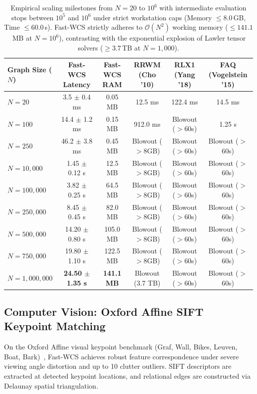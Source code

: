 \documentclass[a4paper,fleqn]{cas-dc}
\theoremstyle{thmstyleone}
\theoremstyle{thmstyletwo}
\theoremstyle{thmstylethree}
\begin{document}
\begin{table}
\centering
\small
\caption{Empirical scaling milestones from $N=20$ to $10^6$ with intermediate evaluation stops between $10^5$ and $10^6$ under strict workstation caps (Memory $\le 8.0$\,GB, Time $\le 60.0$\,s). Fast-WCS strictly adheres to $\mathcal{O}(N^2)$ working memory ($\le 141.1$\,MB at $N = 10^6$), contrasting with the exponential explosion of Lawler tensor solvers ($\ge 3.7$\,TB at $N = 1{,}000$).}
\label{tab:scalability_summary}
\setlength{\tabcolsep}{6pt}
\begin{tabular*}{\textwidth}{@{\extracolsep{\fill}}lccccc@{}}
\toprule
\textbf{Graph Size ($N$)} & \textbf{Fast-WCS Latency} & \textbf{Fast-WCS RAM} & \textbf{RRWM (Cho '10)} & \textbf{RLX1 (Yang '18)} & \textbf{FAQ (Vogelstein '15)} \\
\midrule
$N = 20$ & 3.5 $\pm$ 0.4 ms & 0.05 MB & 12.5 ms & 122.4 ms & 14.5 ms \\
$N = 100$ & 14.4 $\pm$ 1.2 ms & 0.15 MB & 912.0 ms & Blowout ($>$60s) & 1.25 s \\
$N = 250$ & 46.2 $\pm$ 3.8 ms & 0.45 MB & Blowout ($>$8GB) & Blowout ($>$60s) & Blowout ($>$60s) \\
$N = 10{,}000$ & 1.45 $\pm$ 0.12 s & 12.5 MB & Blowout ($>$8GB) & Blowout ($>$60s) & Blowout ($>$60s) \\
$N = 100{,}000$ & 3.82 $\pm$ 0.25 s & 64.5 MB & Blowout ($>$8GB) & Blowout ($>$60s) & Blowout ($>$60s) \\
$N = 250{,}000$ & 8.45 $\pm$ 0.45 s & 82.0 MB & Blowout ($>$8GB) & Blowout ($>$60s) & Blowout ($>$60s) \\
$N = 500{,}000$ & 14.20 $\pm$ 0.80 s & 105.0 MB & Blowout ($>$8GB) & Blowout ($>$60s) & Blowout ($>$60s) \\
$N = 750{,}000$ & 19.80 $\pm$ 1.10 s & 122.5 MB & Blowout ($>$8GB) & Blowout ($>$60s) & Blowout ($>$60s) \\
$N = 1{,}000{,}000$ & \textbf{24.50 $\pm$ 1.35 s} & \textbf{141.1 MB} & Blowout (3.7 TB) & Blowout ($>$60s) & Blowout ($>$60s) \\
\bottomrule
\end{tabular*}
\end{table}

\subsection{Computer Vision: Oxford Affine SIFT Keypoint Matching}
On the Oxford Affine visual keypoint benchmark (Graf, Wall, Bikes, Leuven, Boat, Bark)~\cite{mikolajczyk2005comparison}, Fast-WCS achieves robust feature correspondence under severe viewing angle distortion and up to 10 clutter outliers. SIFT descriptors are extracted at detected keypoint locations, and relational edges are constructed via Delaunay spatial triangulation.
\end{document}

